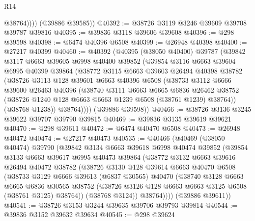 \begin{lexlean}{R14}
\begin{coremodule}
              @38764))))
      (@39886 @39585))
@40392 := @38726 @3119 @3246 @39609 @39708 @39787 @39816
@40395 := @39836 @3118 @39606 @39608
@40396 := @298 @39598
@40398 := @6474 @40396 @6508
@40399 := @26948 @40398
@40400 := @27217 @40399
@40460 := @40392
    (@40395
      (@38050 @40400)
      @39787
      (@39842
        @3117
        @6663
        @39605
        @6998
        @40400
        @39852
        (@39854
          @3116
          @6663
          @39604
          @6995
          @40399
          @39864
          (@38772
            @3115
            @6663
            @39603
            @26494
            @40398
            @38782
            (@38726
              @3113
              @128
              @39601
              @6663
              @40396
              @6508
              (@38733
                @3112
                @6666
                @39600
                @26463
                @40396
                (@38740
                  @3111
                  @6663
                  @6665
                  @6836
                  @26462
                  @38752
                  (@38726 @1240 @128 @6663 @6663 @1239 @6508 (@38761 @1239) @38764))
                (@38768 @1238))
              @38764))))
      (@39886 @39598))
@40466 := @38726 @3136 @3245 @39622 @39707 @39790 @39815
@40469 := @39836 @3135 @39619 @39621
@40470 := @298 @39611
@40472 := @6474 @40470 @6508
@40473 := @26948 @40472
@40474 := @27217 @40473
@40535 := @40466
    (@40469
      (@38050 @40474)
      @39790
      (@39842
        @3134
        @6663
        @39618
        @6998
        @40474
        @39852
        (@39854
          @3133
          @6663
          @39617
          @6995
          @40473
          @39864
          (@38772
            @3132
            @6663
            @39616
            @26494
            @40472
            @38782
            (@38726
              @3130
              @128
              @39614
              @6663
              @40470
              @6508
              (@38733
                @3129
                @6666
                @39613
                (@6837 @30565)
                @40470
                (@38740
                  @3128
                  @6663
                  @6665
                  @6836
                  @30565
                  @38752
                  (@38726 @3126 @128 @6663 @6663 @3125 @6508 (@38761 @3125) @38764))
                (@38768 @3124))
              @38764))))
      (@39886 @39611))
@40541 := @38726 @3153 @3244 @39635 @39706 @39793 @39814
@40544 := @39836 @3152 @39632 @39634
@40545 := @298 @39624

\end{coremodule}
\end{lexlean}
